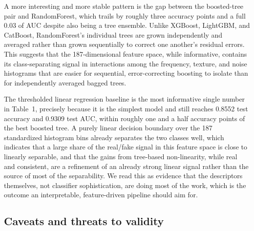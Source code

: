 \documentclass[11pt]{article}
\begin{document}
A more interesting and more stable pattern is the gap between the boosted-tree pair and RandomForest, which trails by roughly three accuracy points and a full 0.03 of AUC despite also being a tree ensemble. Unlike XGBoost, LightGBM, and CatBoost, RandomForest's individual trees are grown independently and averaged rather than grown sequentially to correct one another's residual errors. This suggests that the 187-dimensional feature space, while informative, contains its class-separating signal in interactions among the frequency, texture, and noise histograms that are easier for sequential, error-correcting boosting to isolate than for independently averaged bagged trees.

The thresholded linear regression baseline is the most informative single number in Table~1, precisely because it is the simplest model and still reaches 0.8552 test accuracy and 0.9309 test AUC, within roughly one and a half accuracy points of the best boosted tree. A purely linear decision boundary over the 187 standardized histogram bins already separates the two classes well, which indicates that a large share of the real/fake signal in this feature space is close to linearly separable, and that the gains from tree-based non-linearity, while real and consistent, are a refinement of an already strong linear signal rather than the source of most of the separability. We read this as evidence that the descriptors themselves, not classifier sophistication, are doing most of the work, which is the outcome an interpretable, feature-driven pipeline should aim for.

\subsection{Caveats and threats to validity}
\end{document}
